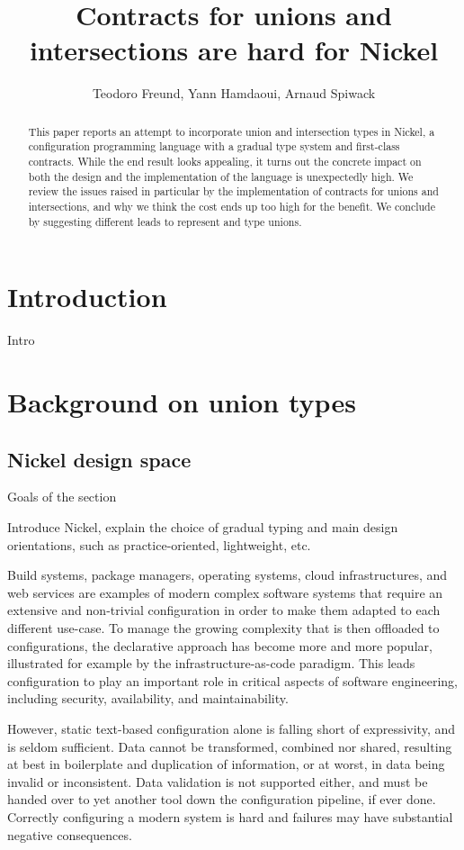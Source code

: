 \documentclass{article}
\title{Contracts for unions and intersections are hard for Nickel}
\author{Teodoro Freund, Yann Hamdaoui, Arnaud Spiwack}
\begin{document}
\maketitle

\begin{abstract}
This paper reports an attempt to incorporate union and intersection types in
Nickel, a configuration programming language with a gradual type system and
first-class contracts. While the end result looks appealing, it turns out the
concrete impact on both the design and the implementation of the language is
unexpectedly high. We review the issues raised in particular by the
implementation of contracts for unions and intersections, and why we think the
cost ends up too high for the benefit. We conclude by suggesting different leads
to represent and type unions.
\end{abstract}

\section*{Introduction}
Intro

\section{Background on union types}

\subsection{Nickel design space}

\color{red}Goals of the section

Introduce Nickel, explain the choice of gradual
typing and main design orientations, such as practice-oriented, lightweight,
etc.\vspace{0.5cm}\color{black}

Build systems, package managers, operating systems, cloud infrastructures, and
web services are examples of modern complex software systems that require an
extensive and non-trivial configuration in order to make them adapted to each
different use-case. To manage the growing complexity that is then offloaded to
configurations, the declarative approach has become more and more popular,
illustrated for example by the infrastructure-as-code paradigm. This leads
configuration to play an important role in critical aspects of software
engineering, including security, availability, and maintainability.

However, static text-based configuration alone is falling short of expressivity,
and is seldom sufficient. Data cannot be transformed, combined nor shared,
resulting at best in boilerplate and duplication of information, or at worst, in
data being invalid or inconsistent. Data validation is not supported either, and must be handed over to yet another tool down the configuration pipeline, if ever
done. Correctly configuring a modern system is hard and failures may have
substantial negative consequences.
\end{document}
